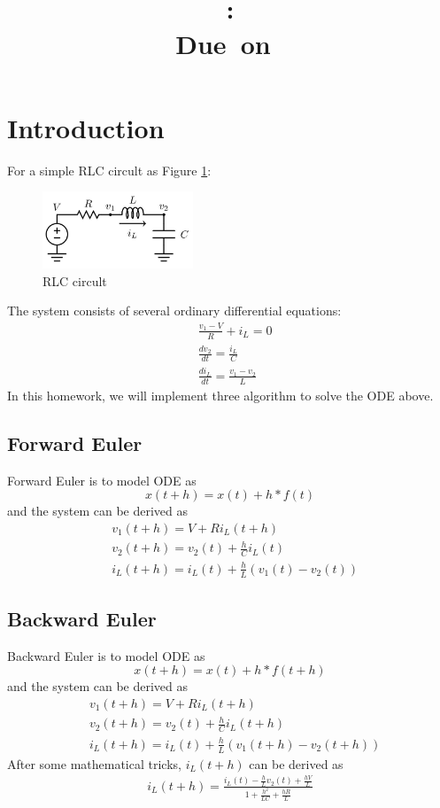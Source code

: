 \documentclass{article}
\title{
    \vspace{2in}
    \textmd{\textbf{\hmwkClass}}\\
    \textmd{\textbf{\hmwkID: \hmwkTitle}} \\
    \normalsize\vspace{0.1in}\small{Due\ on\ \hmwkDueDate}\\
    \vspace{3in}
}
\author{\textbf{\hmwkAuthorName}}
\date{} %
\begin{document}
\maketitle
\newpage

\section{Introduction}
For a simple RLC circult as Figure \ref{fig:RLC}:
\begin{figure}[H]
    \centering
    \includegraphics[width=0.4\textwidth]{src/RLC.jpg}
    \caption{RLC circult}
    \label{fig:RLC}
\end{figure}
The system consists of several ordinary differential equations:
\begin{align}
    & \frac{v_1 - V}{R} + i_L = 0 \\
    & \frac{dv_2}{dt} = \frac{i_L}{C} \\
    & \frac{di_L}{dt} = \frac{v_1 - v_2}{L}
\end{align}
In this homework, we will implement three algorithm to solve the ODE above.

\subsection{Forward Euler}
Forward Euler is to model ODE as 
$$
    x(t + h) = x(t) + h * f(t)
$$
and the system can be derived as
\begin{align}
    & v_1(t+h) = V + Ri_L(t+h) \\
    & v_2(t+h) = v_2(t) + \frac{h}{C}i_L(t) \\
    & i_L(t+h) = i_L(t) + \frac{h}{L}(v_1(t) - v_2(t))
\end{align}

\subsection{Backward Euler}
Backward Euler is to model ODE as
$$
    x(t + h) = x(t) + h * f(t+h)
$$
and the system can be derived as
\begin{align}
    & v_1(t+h) = V + Ri_L(t+h) \\
    & v_2(t+h) = v_2(t) + \frac{h}{C}i_L(t+h) \\
    & i_L(t+h) = i_L(t) + \frac{h}{L}(v_1(t+h) - v_2(t+h))
\end{align}
After some mathematical tricks, $i_L(t+h)$ can be derived as
\begin{align}
    i_L(t+h) = \frac{i_L(t) - \frac{h}{L}v_2(t) + \frac{hV}{L}}{1 + \frac{h^2}{LC} + \frac{hR}{L}}
\end{align}
\end{document}
